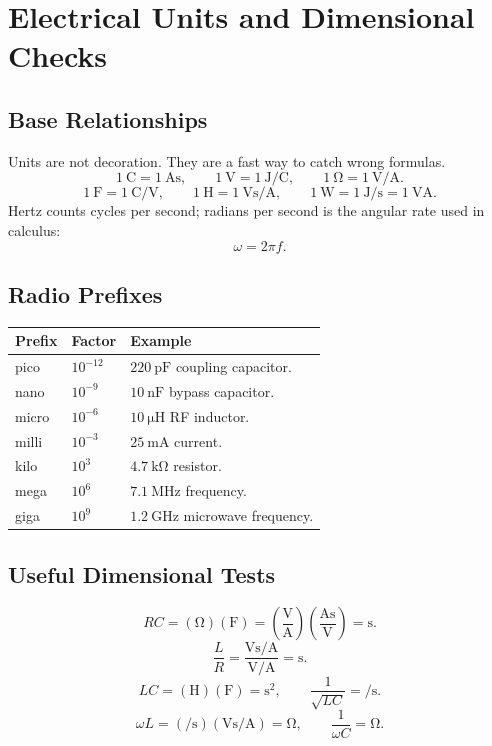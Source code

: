 \chapter{Electrical Units and Dimensional Checks}
\section{Base Relationships}
Units are not decoration. They are a fast way to catch wrong formulas.
\[
\SI{1}{\coulomb}=\SI{1}{\ampere\second},
\qquad
\SI{1}{\volt}=\SI{1}{\joule\per\coulomb},
\qquad
\SI{1}{\ohm}=\SI{1}{\volt\per\ampere}.
\]
\[
\SI{1}{\farad}=\SI{1}{\coulomb\per\volt},
\qquad
\SI{1}{\henry}=\SI{1}{\volt\second\per\ampere},
\qquad
\SI{1}{\watt}=\SI{1}{\joule\per\second}=\SI{1}{\volt\ampere}.
\]
Hertz counts cycles per second; radians per second is the angular rate used in
calculus:
\[
\omega=2\pi f.
\]

\section{Radio Prefixes}
\begin{tabularx}{\textwidth}{@{}L{0.2\textwidth}L{0.2\textwidth}Y@{}}
\toprule
Prefix & Factor & Example \\
\midrule
pico & \(10^{-12}\) & \(\SI{220}{\pico\farad}\) coupling capacitor. \\
nano & \(10^{-9}\) & \(\SI{10}{\nano\farad}\) bypass capacitor. \\
micro & \(10^{-6}\) & \(\SI{10}{\micro\henry}\) RF inductor. \\
milli & \(10^{-3}\) & \(\SI{25}{\milli\ampere}\) current. \\
kilo & \(10^{3}\) & \(\SI{4.7}{\kilo\ohm}\) resistor. \\
mega & \(10^{6}\) & \(\SI{7.1}{\mega\hertz}\) frequency. \\
giga & \(10^{9}\) & \(\SI{1.2}{\giga\hertz}\) microwave frequency. \\
\bottomrule
\end{tabularx}

\section{Useful Dimensional Tests}
\begin{unitsbox}
\[
RC=(\si{\ohm})(\si{\farad})
=\left(\frac{\si{\volt}}{\si{\ampere}}\right)
\left(\frac{\si{\ampere\second}}{\si{\volt}}\right)
=\si{\second}.
\]
\[
\frac{L}{R}
=\frac{\si{\volt\second\per\ampere}}{\si{\volt\per\ampere}}
=\si{\second}.
\]
\[
LC=(\si{\henry})(\si{\farad})=\si{\second\squared},
\qquad
\frac{1}{\sqrt{LC}}=\si{\per\second}.
\]
\[
\omega L=(\si{\per\second})(\si{\volt\second\per\ampere})
=\si{\ohm},
\qquad
\frac{1}{\omega C}=\si{\ohm}.
\]
\end{unitsbox}

